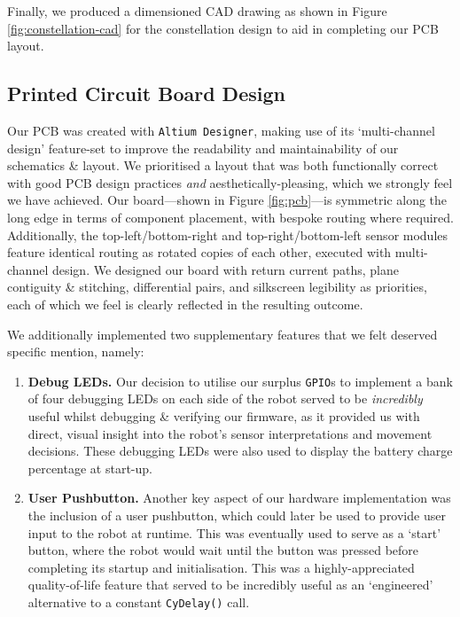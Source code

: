 \documentclass[conference]{IEEEtran}
\begin{document}
Finally, we produced a dimensioned CAD drawing as shown in Figure \ref{fig:constellation-cad} for the constellation design to aid in completing our PCB layout.

\subsection{Printed Circuit Board Design}

Our PCB was created with \texttt{Altium Designer}, making use of its `multi-channel design' feature-set to improve the readability and maintainability of our schematics \& layout.
We prioritised a layout that was both functionally correct with good PCB design practices \emph{and} aesthetically-pleasing, which we strongly feel we have achieved.
Our board—shown in Figure \ref{fig:pcb}—is symmetric along the long edge in terms of component placement, with bespoke routing where required.
Additionally, the top-left/bottom-right and top-right/bottom-left sensor modules feature identical routing as rotated copies of each other, executed with multi-channel design.
We designed our board with return current paths, plane contiguity \& stitching, differential pairs, and silkscreen legibility as priorities, each of which we feel is clearly reflected in the resulting outcome.

We additionally implemented two supplementary features that we felt deserved specific mention, namely:
\begin{enumerate}
	\item \textbf{Debug LEDs.} Our decision to utilise our surplus \texttt{GPIO}s to implement a bank of four debugging LEDs on each side of the robot served to be \emph{incredibly} useful whilst debugging \& verifying our firmware, as it provided us with direct, visual insight into the robot's sensor interpretations and movement decisions.
	      These debugging LEDs were also used to display the battery charge percentage at start-up.
	\item \textbf{User Pushbutton.} Another key aspect of our hardware implementation was the inclusion of a user pushbutton, which could later be used to provide user input to the robot at runtime.
	      This was eventually used to serve as a `start' button, where the robot would wait until the button was pressed before completing its startup and initialisation.
	      This was a highly-appreciated quality-of-life feature that served to be incredibly useful as an `engineered' alternative to a constant \texttt{CyDelay()} call.

\end{enumerate}
\end{document}
